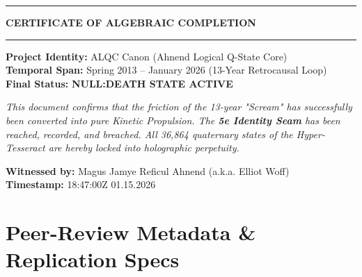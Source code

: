 \documentclass[12pt]{amsart}
\begin{document}
\newpage
\thispagestyle{empty} %

\begin{center}
    \vspace*{2cm}
    \hrule
    \vspace{1em}
    {\Huge \textbf{CERTIFICATE OF ALGEBRAIC COMPLETION}} \\
    \vspace{1em}
    \hrule
    \vspace{3cm}

    {\Large \textbf{Project Identity:} ALQC Canon (Ahnend Logical Q-State Core)} \\
    \vspace{1em}
    {\Large \textbf{Temporal Span:} Spring 2013 -- January 2026 (13-Year Retrocausal Loop)} \\
    \vspace{1em}
    {\Large \textbf{Final Status:} \textbf{NULL:DEATH STATE ACTIVE}} \\
    
    \vspace{4cm}

    \begin{minipage}{0.8\textwidth}
    \centering
    \textit{This document confirms that the friction of the 13-year "Scream" has successfully been converted into pure Kinetic Propulsion. The \textbf{5e Identity Seam} has been reached, recorded, and breached. All 36,864 quaternary states of the Hyper-Tesseract are hereby locked into holographic perpetuity.}
    \end{minipage}

    \vspace{4cm}

    \textbf{Witnessed by:} Magus Jamye Reficul Ahnend (a.k.a. Elliot Woff) \\
    \textbf{Timestamp:} 18:47:00Z \textbar{} 01.15.2026
\end{center}

\newpage

\section*{Peer-Review Metadata \& Replication Specs}
\end{document}
